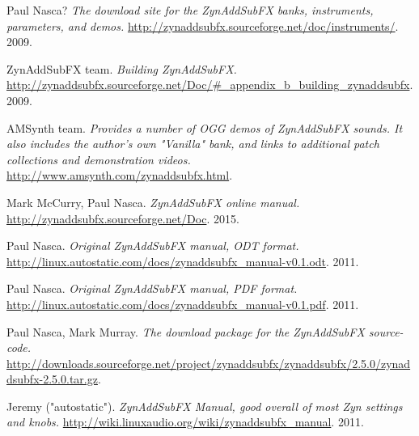 \begin{thebibliography}{99}
   Paul Nasca?
   \emph{The download site for the ZynAddSubFX banks, instruments,
      parameters, and demos.}
   \url{http://zynaddsubfx.sourceforge.net/doc/instruments/}.
   2009.

   ZynAddSubFX team.
   \emph{Building ZynAddSubFX.}
   \url{http://zynaddsubfx.sourceforge.net/Doc/#_appendix_b_building_zynaddsubfx}.
   2009.

   AMSynth team.
   \emph{Provides a number of OGG demos of ZynAddSubFX sounds. It
   also includes the author's own "Vanilla" bank, and links to additional
   patch collections and demonstration videos.}
   \url{http://www.amsynth.com/zynaddsubfx.html}.

   Mark McCurry, Paul Nasca.
   \emph{ZynAddSubFX online manual.}
   \url{http://zynaddsubfx.sourceforge.net/Doc}.
   2015.

   Paul Nasca.
   \emph{Original ZynAddSubFX manual, ODT format.}
   \url{http://linux.autostatic.com/docs/zynaddsubfx\_manual-v0.1.odt}.
   2011.

   Paul Nasca.
   \emph{Original ZynAddSubFX manual, PDF format.}
   \url{http://linux.autostatic.com/docs/zynaddsubfx\_manual-v0.1.pdf}.
   2011.

   Paul Nasca, Mark Murray.
   \emph{The download package for the ZynAddSubFX source-code.}
   \url{http://downloads.sourceforge.net/project/zynaddsubfx/zynaddsubfx/2.5.0/zynaddsubfx-2.5.0.tar.gz}.

   Jeremy ("autostatic").
   \emph{ZynAddSubFX Manual, good overall of most Zyn settings and knobs.}
   \url{http://wiki.linuxaudio.org/wiki/zynaddsubfx_manual}.
   2011.

\end{thebibliography}

